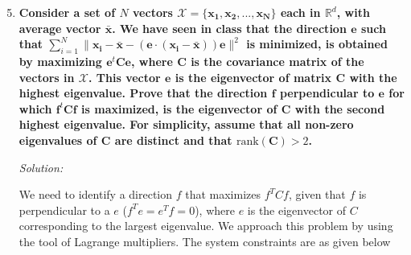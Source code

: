 \documentclass[11pt]{article}
\begin{document}
\maketitle

\begin{enumerate}
\setcounter{enumi}{4}
\item {\bf Consider a set of $N$ vectors $\mathcal{X} = \{\boldsymbol{x_1}, \boldsymbol{x_2}, ..., \boldsymbol{x_N}\}$ each in $\mathbb{R}^d$, with average vector $\boldsymbol{\bar{x}}$. We have seen in class that the direction $\boldsymbol{e}$ such that $\sum_{i=1}^N \|\boldsymbol{x_i}-\boldsymbol{\bar{x}}-(\boldsymbol{e} \cdot (\boldsymbol{x_i}-\boldsymbol{\bar{x}}))\boldsymbol{e}\|^2$ is minimized, is obtained by maximizing $\boldsymbol{e}^t \boldsymbol{C} \boldsymbol{e}$, where $\boldsymbol{C}$ is the covariance matrix of the vectors in $\mathcal{X}$. This vector $\boldsymbol{e}$ is the eigenvector of matrix $\boldsymbol{C}$ with the highest eigenvalue. Prove that the direction $\boldsymbol{f}$ perpendicular to $\boldsymbol{e}$ for which $\boldsymbol{f}^t \boldsymbol{C} \boldsymbol{f}$ is maximized, is the eigenvector of $\boldsymbol{C}$ with the second highest eigenvalue. For simplicity, assume that all non-zero eigenvalues of $\boldsymbol{C}$ are distinct and that $\textrm{rank}(\boldsymbol{C}) > 2$.}

{\em Solution:}
\vspace*{1em}

\hspace*{1em}We need to identify a direction $f$ that maximizes $f^TCf$, given that $f$ is perpendicular to a $e$ ($f^Te = e^Tf = 0$), where $e$ is the eigenvector of $C$ corresponding to the largest eigenvalue. We approach this problem by using the tool of Lagrange multipliers. The system constraints are as given below


\end{enumerate}
\end{document}
